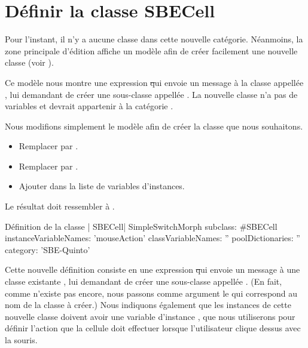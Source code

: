 \documentclass[a4paper,10pt,twoside]{book}
\begin{document}
\section{Définir la classe SBECell}

Pour l'instant, il n'y a aucune classe dans cette nouvelle catégorie. Néanmoins, la zone principale d'édition affiche un modèle afin de créer facilement une nouvelle classe (voir ).

Ce modèle nous montre une expression \st qui envoie un message à la classe appellée , lui demandant de créer une sous-classe appellée .  La nouvelle classe n'a pas de variables et devrait appartenir à la catégorie .

Nous modifions simplement le modèle afin de créer la classe que nous souhaitons.

\begin{itemize}
  \item Remplacer  par .
  \item Remplacer  par .
  \item Ajouter  dans la liste de variables d'instances.
\end{itemize}
Le résultat doit ressembler à .

\begin{classdef}[firstClassDef]{Définition de la classe \ct| SBECell|}
SimpleSwitchMorph subclass: #SBECell
   instanceVariableNames: 'mouseAction'
   classVariableNames: ''
   poolDictionaries: ''
   category: 'SBE-Quinto'
\end{classdef}

Cette nouvelle définition consiste en une expression \st qui envoie un message à une classe existante , lui demandant de créer une sous-classe appellée .
(En fait, comme  n'existe pas encore, nous passons comme argument le   qui  correspond au nom de la classe à créer.)
Nous indiquons également que les instances de cette nouvelle classe doivent avoir une variable d'instance , que nous utiliserons pour définir l'action que la cellule doit effectuer lorsque l'utilisateur clique dessus avec la souris.
\end{document}
